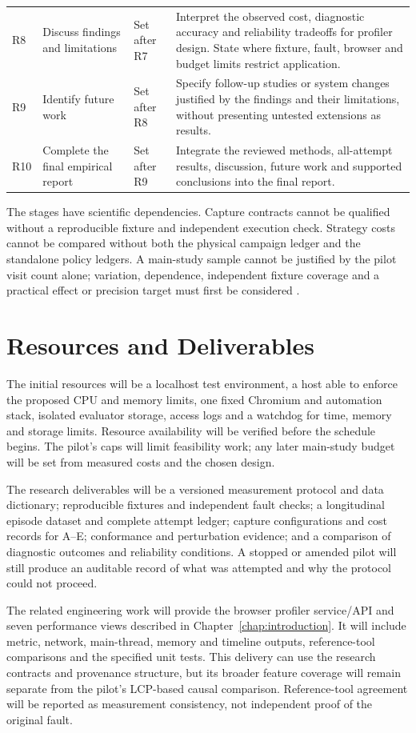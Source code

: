 \begin{longtable}{@{}p{}p{}p{}p{}@{}}
R8 & Discuss findings and limitations & Set after R7 & Interpret the observed cost, diagnostic accuracy and reliability tradeoffs for profiler design. State where fixture, fault, browser and budget limits restrict application. \\
R9 & Identify future work & Set after R8 & Specify follow-up studies or system changes justified by the findings and their limitations, without presenting untested extensions as results. \\
R10 & Complete the final empirical report & Set after R9 & Integrate the reviewed methods, all-attempt results, discussion, future work and supported conclusions into the final report. \\
\end{longtable}

The stages have scientific dependencies. Capture contracts cannot be qualified without a reproducible fixture and independent execution check. Strategy costs cannot be compared without both the physical campaign ledger and the standalone policy ledgers. A main-study sample cannot be justified by the pilot visit count alone; variation, dependence, independent fixture coverage and a practical effect or precision target must first be considered \parencite{GJMALCNF,E8MGSAC8}.

\section{Resources and Deliverables}

The initial resources will be a localhost test environment, a host able to enforce the proposed CPU and memory limits, one fixed Chromium and automation stack, isolated evaluator storage, access logs and a watchdog for time, memory and storage limits. Resource availability will be verified before the schedule begins. The pilot's caps will limit feasibility work; any later main-study budget will be set from measured costs and the chosen design.

The research deliverables will be a versioned measurement protocol and data dictionary; reproducible fixtures and independent fault checks; a longitudinal episode dataset and complete attempt ledger; capture configurations and cost records for A--E; conformance and perturbation evidence; and a comparison of diagnostic outcomes and reliability conditions. A stopped or amended pilot will still produce an auditable record of what was attempted and why the protocol could not proceed.

The related engineering work will provide the browser profiler service/API and seven performance views described in Chapter~\ref{chap:introduction}. It will include metric, network, main-thread, memory and timeline outputs, reference-tool comparisons and the specified unit tests. This delivery can use the research contracts and provenance structure, but its broader feature coverage will remain separate from the pilot's LCP-based causal comparison. Reference-tool agreement will be reported as measurement consistency, not independent proof of the original fault.

